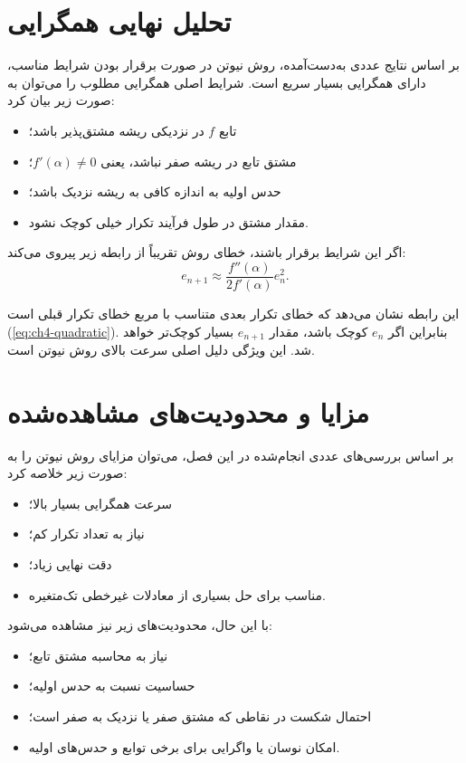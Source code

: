 \section{تحلیل نهایی همگرایی}

بر اساس نتایج عددی به‌دست‌آمده، روش نیوتن در صورت برقرار بودن شرایط مناسب، دارای همگرایی بسیار سریع است. شرایط اصلی همگرایی مطلوب را می‌توان به صورت زیر بیان کرد:
\begin{itemize}
\item تابع $f$ در نزدیکی ریشه مشتق‌پذیر باشد؛
\item مشتق تابع در ریشه صفر نباشد، یعنی $f'(\alpha)\neq 0$؛
\item حدس اولیه به اندازه کافی به ریشه نزدیک باشد؛
\item مقدار مشتق در طول فرآیند تکرار خیلی کوچک نشود.
\end{itemize}

اگر این شرایط برقرار باشند، خطای روش تقریباً از رابطه زیر پیروی می‌کند:
\begin{equation}
e_{n+1}
\approx
\frac{f''(\alpha)}{2f'(\alpha)}e_n^2.
\label{eq:ch4-error-relation}
\end{equation}

این رابطه نشان می‌دهد که خطای تکرار بعدی متناسب با مربع خطای تکرار قبلی است (\eqref{eq:ch4-quadratic}). بنابراین اگر $e_n$ کوچک باشد، مقدار $e_{n+1}$ بسیار کوچک‌تر خواهد شد. این ویژگی دلیل اصلی سرعت بالای روش نیوتن است.

\section{مزایا و محدودیت‌های مشاهده‌شده}

بر اساس بررسی‌های عددی انجام‌شده در این فصل، می‌توان مزایای روش نیوتن را به صورت زیر خلاصه کرد:
\begin{itemize}
\item سرعت همگرایی بسیار بالا؛
\item نیاز به تعداد تکرار کم؛
\item دقت نهایی زیاد؛
\item مناسب برای حل بسیاری از معادلات غیرخطی تک‌متغیره.
\end{itemize}

با این حال، محدودیت‌های زیر نیز مشاهده می‌شود:
\begin{itemize}
\item نیاز به محاسبه مشتق تابع؛
\item حساسیت نسبت به حدس اولیه؛
\item احتمال شکست در نقاطی که مشتق صفر یا نزدیک به صفر است؛
\item امکان نوسان یا واگرایی برای برخی توابع و حدس‌های اولیه.
\end{itemize}

